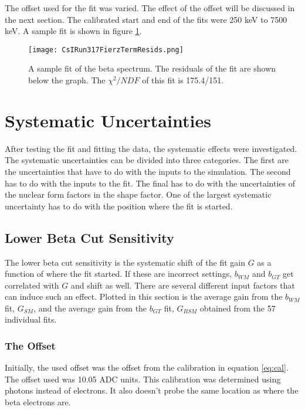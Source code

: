 \documentclass[../MaxHughesThesis.tex]{subfiles}
\begin{document}
The offset used for the fit was varied.
The effect of the offset will be discussed in the next section. 
The calibrated start and end of the fits were 250 keV to 7500 keV. 
A sample fit is shown in figure \ref{fig:samplefit}.

\begin{figure}[!htb]
	\centerline{\texttt{[image: CsIRun317FierzTermResids.png]}}
	\caption{A sample fit of the beta spectrum. 
		 The residuals of the fit are shown below the graph.
		 The $\chi^{2}/NDF$ of this fit is 175.4/151.}
	\label{fig:samplefit}
\end{figure}

\section{Systematic Uncertainties}

After testing the fit and fitting the data, the systematic effects were investigated.
The systematic uncertainties can be divided into three categories.
The first  are the uncertainties that have to do with the inputs to the simulation.
The second  has to do with the inputs to the fit.
The final  has to do with the uncertainties of the nuclear form factors in the shape factor. 
One of the largest systematic uncertainty has to do with the position where the fit is started. 

\subsection{Lower Beta Cut Sensitivity}

The lower beta cut sensitivity is the systematic shift of the fit gain $G$ as a function of where the fit started.
If these are incorrect settings, $b_{WM}$ and $b_{GT}$ get correlated with $G$ and shift as well.
There are several different input factors that can induce such an effect.
Plotted in this section is the average gain from the $b_{WM}$ fit, $G_{SM}$, and the average gain from the $b_{GT}$ fit, $G_{BSM}$ obtained from the 57 individual fits.

\subsubsection{The Offset}
Initially, the used offset was the offset from the calibration in equation \ref{eq:cal}.
The offset used was 10.05 ADC units.
This calibration was determined using photons instead of electrons.
It also doesn't probe the same location as where the beta electrons are.
\end{document}
